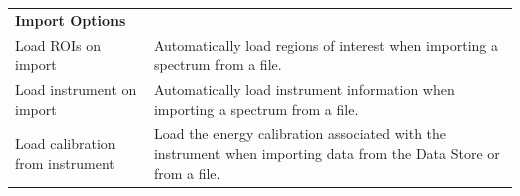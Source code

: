 \begin{longtable}{p{} p{}}

    \multicolumn{2}{l}{\textbf{Import Options}} \\

    Load ROIs on import &
        Automatically load regions of interest when importing a spectrum from a file. \\

    Load instrument on import &
        Automatically load instrument information when importing a spectrum from a file. \\

    Load calibration from instrument &
        Load the energy calibration associated with the instrument when
        importing data from the Data Store or from a file. \\

\end{longtable}



